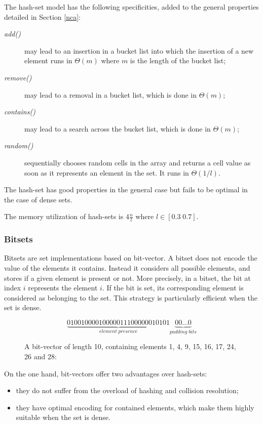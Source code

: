 \documentclass{article}
\newcommand{\complexityvalue}[1]{$\Theta(#1)$}
\newcommand{\prmtv}[1]{\textit{#1()}}
\begin{document}
The hash-set model has the following specificities, added to the general properties detailed in Section \ref{nca}:
\begin{description}
\item[\prmtv{add}] may lead to an insertion in a bucket list into which the insertion of a new element runs in \complexityvalue{m}
where $m$ is the length of the bucket list;
\item[\prmtv{remove}] may lead to a removal in a bucket list, which is done in \complexityvalue{m};
\item[\prmtv{contains}]  may lead to a search across the bucket list, which is done in \complexityvalue{m};
\item[\prmtv{random}] sequentially chooses random cells in the array and returns a cell value as soon as it represents an
element in the set. It runs in \complexityvalue{1/l}.
\end{description}


The hash-set has good properties in the general case but fails to be optimal in the case of dense sets.


The memory utilization of hash-sets is $4\frac{n}{l}$ where $l \in [0.3\;0.7]$.


\subsubsection{Bitsets}

Bitsets are set implementations based on bit-vector. A bitset does not encode the value of the elements it
contains. Instead it considers all possible elements, and stores if a given element is present or not.
More precisely, in a bitset, the bit at index $i$ represents the element $i$. If the bit is set,
its corresponding element is considered as belonging to the set.
This strategy is particularly efficient when the set is dense.


\begin{figure}
$$
  \underbrace{0100 1000  0100 0001  1100 0000  1010 1}_{element\; presence} \underbrace{00\ldots0}_{padding\; bits}
$$
\caption{A  bit-vector of length 10, containing elements  1, 4, 9, 15, 16, 17, 24, 26 and 28:}
\end{figure}


On the one hand, bit-vectors offer two advantages over hash-sets:
\begin{itemize}
  \item they do not suffer from the overload of hashing and collision resolution;
  \item they have optimal encoding for contained elements, which make them highly suitable when the set is dense. 
\end{itemize}
\end{document}
